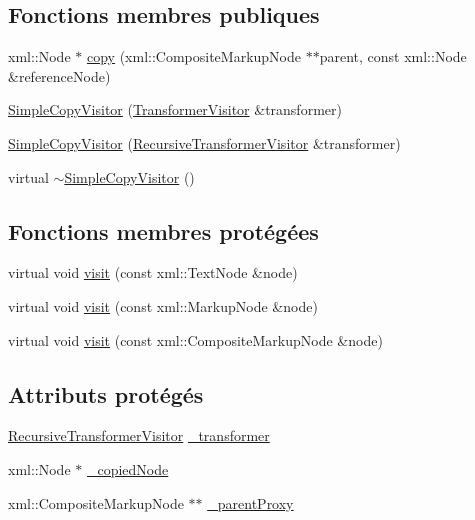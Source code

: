 \subsection*{Fonctions membres publiques}
\begin{DoxyCompactItemize}
\item 
xml::Node $\ast$ \hyperlink{classxsl_1_1_simple_copy_visitor_a635dd86100529983335aa35283450227}{copy} (xml::CompositeMarkupNode $\ast$$\ast$parent, const xml::Node \&referenceNode)
\item 
\hyperlink{classxsl_1_1_simple_copy_visitor_a81aa92c2b248851fe1fa626dc2bfaef0}{SimpleCopyVisitor} (\hyperlink{classxsl_1_1_transformer_visitor}{TransformerVisitor} \&transformer)
\item 
\hyperlink{classxsl_1_1_simple_copy_visitor_a532b61a79726327c4653de11e5592e08}{SimpleCopyVisitor} (\hyperlink{classxsl_1_1_recursive_transformer_visitor}{RecursiveTransformerVisitor} \&transformer)
\item 
virtual \hyperlink{classxsl_1_1_simple_copy_visitor_a35dd73ab468988333fad21aba4502eff}{$\sim$SimpleCopyVisitor} ()
\end{DoxyCompactItemize}
\subsection*{Fonctions membres protégées}
\begin{DoxyCompactItemize}
\item 
virtual void \hyperlink{classxsl_1_1_simple_copy_visitor_a2af765f5955c795d73c5aa6edbe1ae93}{visit} (const xml::TextNode \&node)
\item 
virtual void \hyperlink{classxsl_1_1_simple_copy_visitor_a67f58002edb998f71775c790084ac388}{visit} (const xml::MarkupNode \&node)
\item 
virtual void \hyperlink{classxsl_1_1_simple_copy_visitor_a7afb4e9198dae8246736bed6f15a4b88}{visit} (const xml::CompositeMarkupNode \&node)
\end{DoxyCompactItemize}
\subsection*{Attributs protégés}
\begin{DoxyCompactItemize}
\item 
\hyperlink{classxsl_1_1_recursive_transformer_visitor}{RecursiveTransformerVisitor} \hyperlink{classxsl_1_1_simple_copy_visitor_a43aa3841e33993efd71980af58a09eb8}{\_\-transformer}
\item 
xml::Node $\ast$ \hyperlink{classxsl_1_1_simple_copy_visitor_a181cd3a2e2aed778efe9fbc8f5fe0bf8}{\_\-copiedNode}
\item 
xml::CompositeMarkupNode $\ast$$\ast$ \hyperlink{classxsl_1_1_simple_copy_visitor_a7193e6b1b0a45af85b5346240559670a}{\_\-parentProxy}
\end{DoxyCompactItemize}


